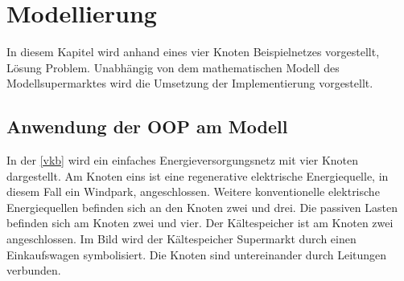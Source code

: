 \chapter{Modellierung}
\label{chap:SEVN}
\minitoc

In diesem Kapitel wird anhand eines vier Knoten Beispielnetzes vorgestellt,
Lösung Problem. Unabhängig von dem
mathematischen Modell des Modellsupermarktes wird die Umsetzung der
Implementierung vorgestellt.


\section{Anwendung der OOP am Modell}

In der \cref{vkb} wird ein einfaches Energieversorgungsnetz mit vier Knoten
dargestellt. Am Knoten eins ist eine regenerative elektrische Energiequelle, in
diesem Fall ein Windpark, angeschlossen. Weitere konventionelle elektrische
Energiequellen befinden sich an den Knoten zwei und drei. Die passiven Lasten
befinden sich am Knoten zwei und vier. Der Kältespeicher ist am Knoten zwei
angeschlossen. Im Bild wird der Kältespeicher Supermarkt durch einen
Einkaufswagen symbolisiert. Die Knoten sind untereinander durch Leitungen
verbunden.


